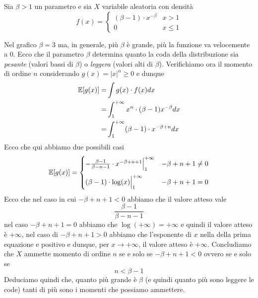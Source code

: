 \begin{example}
	Sia $\beta > 1$ un parametro e sia $X$ variabile aleatoria con densità
	\[
		f(x) = \begin{cases}
			(\beta - 1) \cdot x^{-\beta} & x > 1    \\
			0                            & x \leq 1
		\end{cases}
	\]
	\begin{center}
	\end{center}
	Nel grafico $\beta = 3$ ma, in generale, più $\beta$ è grande, più la funzione va velocemente
	a 0. Ecco che il parametro $\beta$ determina quanto la coda della distribuzione sia
	\emph{pesante} (valori bassi di $\beta$) o \emph{leggera} (valori alti di $\beta$).
	Verifichiamo ora il momento di ordine $n$ considerando $g(x) = |x|^n \geq 0$ e dunque
	\begin{align*}
		\mathbb{E}[g(x)] = & \int g(x) \cdot f(x) dx                              \\
		=          & \int_1^{+\infty} x^n \cdot (\beta - 1) x^{-\beta} dx \\
		=          & \int_{1}^{+\infty} (\beta-1) \cdot x^{-\beta+n} dx
	\end{align*}
	Ecco che qui abbiamo due possibili casi
	\[
		\mathbb{E}[g(x)] = \begin{cases}
			-\frac{\beta-1}{\beta-n-1} \cdot x^{-\beta+n+1} \Big|_1^{+\infty}
			                                          & -\beta+n+1 \neq 0 \\[2ex]
			(\beta-1) \cdot \log(x) \Big|_1^{+\infty} & -\beta+n+1=0
		\end{cases}
	\]
	Ecco che nel caso in cui $-\beta+n+1 < 0$ abbiamo che il valore atteso vale
	\[ \frac{\beta-1}{\beta-n-1} \]
	nel caso $-\beta+n+1 = 0$ abbiamo che $\log(+\infty) = +\infty$ e quindi il valore atteso è
	$+\infty$, nel caso di $-\beta+n+1 > 0$ abbiamo che l'esponente di $x$ nella della prima
	equazione e positivo e dunque, per $x \to +\infty$, il valore atteso è $+\infty$. Concludiamo
	che $X$ ammette momento di ordine $n$ se e solo se $-\beta+n+1 < 0$ ovvero se e solo se
	\[ n < \beta - 1 \]
	Deduciamo quindi che, quanto più grande è $\beta$ (e quindi quanto più sono leggere le code)
	tanti di più sono i momenti che possiamo ammettere.
\end{example}

